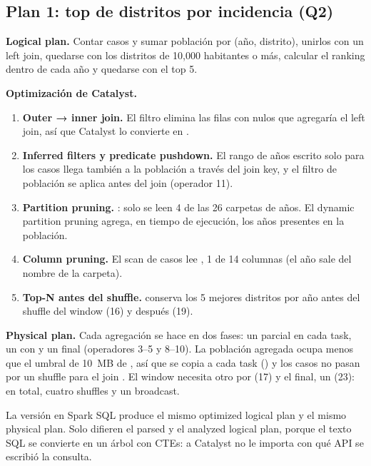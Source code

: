 \subsection{Plan 1: top de distritos por incidencia (Q2)}

\textbf{Logical plan.} Contar casos y sumar población por (año, distrito), unirlos con un left join, quedarse con
los distritos de 10,000 habitantes o más, calcular el ranking dentro de cada año y quedarse con el top 5.

\textbf{Optimización de Catalyst.}
\begin{enumerate}
  \item \textbf{Outer → inner join.} El filtro  elimina las filas con nulos que
        agregaría el left join, así que Catalyst lo convierte en .
  \item \textbf{Inferred filters y predicate pushdown.} El rango de años escrito solo para los casos llega
        también a la población a través del join key, y el filtro de población se aplica antes del join
        (operador 11).
  \item \textbf{Partition pruning.} : solo se leen 4 de
        las 26 carpetas de años. El dynamic partition pruning agrega, en tiempo de ejecución, los años presentes
        en la población.
  \item \textbf{Column pruning.} El scan de casos lee , 1 de 14 columnas (el año
        sale del nombre de la carpeta).
  \item \textbf{Top-N antes del shuffle.}  conserva los 5 mejores distritos por año antes
        del shuffle del window (16) y después (19).
\end{enumerate}

\textbf{Physical plan.} Cada agregación se hace en dos fases: un  parcial en cada task, un
 con  y un  final (operadores 3–5 y 8–10). La población
agregada ocupa menos que el umbral de 10~MB de , así que se copia a cada task
() y los casos no pasan por un shuffle para el join
\cite{spark-tuning}. El window necesita otro  por  (17) y el  final, un
 (23): en total, cuatro shuffles y un broadcast.

La versión en Spark SQL produce el mismo optimized logical plan y el mismo physical plan. Solo difieren el
parsed y el analyzed logical plan, porque el texto SQL se convierte en un árbol con CTEs: a Catalyst no le
importa con qué API se escribió la consulta.

